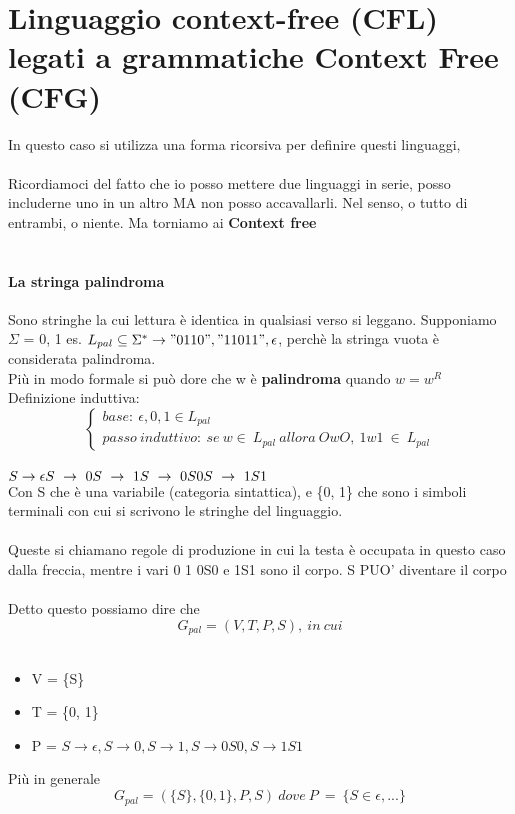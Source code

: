 \documentclass[12pt, a4paper, openany, oneside]{book}
\begin{document}
\section{Linguaggio context-free (CFL) legati a grammatiche Context Free (CFG)}
In questo caso si utilizza una forma ricorsiva per definire questi linguaggi,
\\ \\
Ricordiamoci del fatto che io posso mettere due linguaggi in serie, posso 
includerne uno in un altro MA non posso accavallarli. Nel senso, o tutto di 
entrambi, o niente. Ma torniamo ai \textbf{Context free}
\\ \\
\paragraph{La stringa palindroma}
Sono stringhe la cui lettura è identica in qualsiasi verso si leggano. Supponiamo
$\Sigma$ = {0, 1} es. $L_{pal} \subseteq \Sigma ^{*} \to "0110", "11011", 
\epsilon$, perchè la stringa vuota è considerata palindroma. \\ 
Più in modo formale si può dore che w è \textbf{palindroma} quando $w = w^{R}$
Definizione induttiva:
\[
\begin{cases}
base:~\epsilon, 0, 1 \in L_{pal} \\
passo~induttivo:~ se ~w\in ~L_{pal} ~allora ~OwO, ~1w1 ~\in ~L_{pal}
\end{cases}
\]
\\
$
S \to \epsilon\\
S ~ \to ~ 0 \\
S ~ \to ~ 1 \\
S ~ \to ~ 0S0 \\
S ~ \to ~ 1S1$ \\
Con S che è una variabile (categoria sintattica), e \{0, 1\} che sono i simboli
terminali con cui si scrivono le stringhe del linguaggio.\\ \\
Queste si chiamano regole di produzione in cui la testa è occupata in questo
caso dalla freccia, mentre i vari 0 1 0S0 e 1S1 sono il corpo. S PUO' diventare
il corpo \\ \\ 
Detto questo possiamo dire che
$$G_{pal} = (V, T, P, S), ~in ~cui $$\\
\begin{itemize}
	\item V = \{S\}
	\item T = \{0, 1\}
	\item P = $S \to \epsilon, S \to 0, S \to 1, S \to 0S0, S \to 1S1$
\end{itemize}
Più in generale
$$G_{pal} = (\{S\},\{0, 1\}, P, S) ~  dove ~  P  ~ = ~  \{S \in \epsilon, ...\}$$
\end{document}
